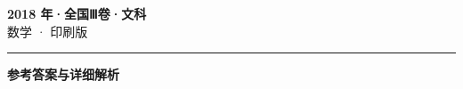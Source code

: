 \documentclass[zihao=5, a4paper]{ctexart}
\begin{document}
\begin{center}
  {\Large\bfseries 2018 年·全国Ⅲ卷·文科}\\[4pt]
  {\large 数学 · 印刷版}
\end{center}
\medskip
{}

\par\bigskip\hrule\bigskip
{}
\begin{center}{\large\bfseries 参考答案与详细解析}\end{center}
\smallskip

\end{document}
